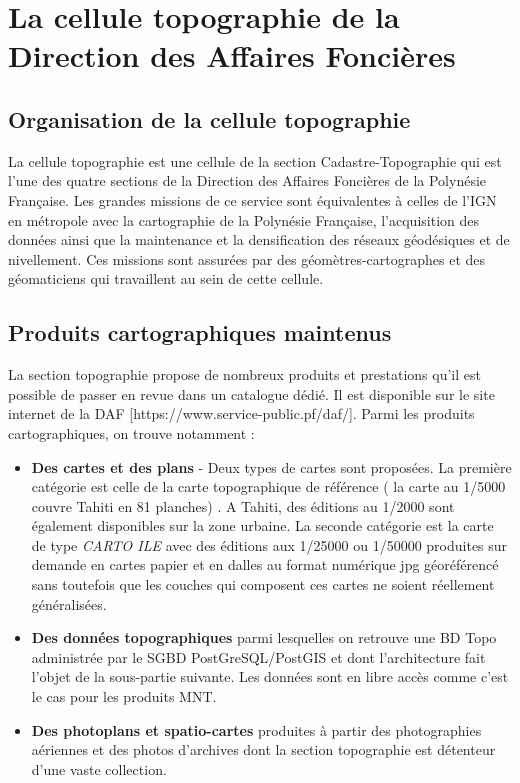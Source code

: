 
\section{La cellule topographie de la Direction des Affaires Foncières}


\subsection{Organisation de la cellule topographie}
La cellule topographie est une cellule de la section Cadastre-Topographie qui est l'une des quatre sections de la Direction des Affaires Foncières de la Polynésie Française. Les grandes missions de ce service sont équivalentes à celles de l'IGN en métropole avec la cartographie de la Polynésie Française, l'acquisition des données ainsi que la maintenance et la densification des réseaux géodésiques et de nivellement. Ces missions sont assurées par des géomètres-cartographes et des géomaticiens qui travaillent au sein de cette cellule. 

\subsection{Produits cartographiques maintenus}
La section topographie propose de nombreux produits et prestations qu'il est possible de passer en revue dans un catalogue dédié. Il est disponible sur le site internet de la DAF [https://www.service-public.pf/daf/]. Parmi les produits cartographiques, on trouve notamment :

\begin{itemize}
\item \textbf{Des cartes et des plans } - Deux types de cartes sont proposées. La première catégorie est celle de la carte topographique de référence ( la carte au 1/5000 couvre Tahiti en 81 planches) . A Tahiti, des éditions au 1/2000 sont également disponibles sur la zone urbaine. La seconde catégorie est la carte de type \textit{CARTO ILE} avec des éditions aux 1/25000 ou 1/50000 produites sur demande en cartes papier et en dalles au format numérique jpg géoréférencé sans toutefois que les couches qui composent ces cartes ne soient réellement généralisées.
\item \textbf{Des données topographiques} parmi lesquelles on retrouve une BD Topo administrée par le SGBD PostGreSQL/PostGIS  et dont l'architecture fait l'objet de la sous-partie suivante. Les données sont en libre accès comme c'est le cas pour les produits MNT.
\item \textbf{Des photoplans et spatio-cartes} produites à partir des photographies aériennes et des photos d'archives dont la section topographie est détenteur d'une vaste collection.
\end{itemize}

